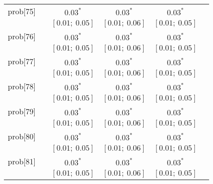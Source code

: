\begin{table}
\begin{center}
\begin{tabular}{l c c c c c }
prob[75]    &                                  & $0.03^{*}$                & $0.03^{*}$                & $0.03^{*}$              &                         \\
            &                                  & $[0.01;\ 0.05]$           & $[0.01;\ 0.06]$           & $[0.01;\ 0.05]$         &                         \\
prob[76]    &                                  & $0.03^{*}$                & $0.03^{*}$                & $0.03^{*}$              &                         \\
            &                                  & $[0.01;\ 0.05]$           & $[0.01;\ 0.06]$           & $[0.01;\ 0.05]$         &                         \\
prob[77]    &                                  & $0.03^{*}$                & $0.03^{*}$                & $0.03^{*}$              &                         \\
            &                                  & $[0.01;\ 0.05]$           & $[0.01;\ 0.06]$           & $[0.01;\ 0.05]$         &                         \\
prob[78]    &                                  & $0.03^{*}$                & $0.03^{*}$                & $0.03^{*}$              &                         \\
            &                                  & $[0.01;\ 0.05]$           & $[0.01;\ 0.06]$           & $[0.01;\ 0.05]$         &                         \\
prob[79]    &                                  & $0.03^{*}$                & $0.03^{*}$                & $0.03^{*}$              &                         \\
            &                                  & $[0.01;\ 0.05]$           & $[0.01;\ 0.06]$           & $[0.01;\ 0.05]$         &                         \\
prob[80]    &                                  & $0.03^{*}$                & $0.03^{*}$                & $0.03^{*}$              &                         \\
            &                                  & $[0.01;\ 0.05]$           & $[0.01;\ 0.06]$           & $[0.01;\ 0.05]$         &                         \\
prob[81]    &                                  & $0.03^{*}$                & $0.03^{*}$                & $0.03^{*}$              &                         \\
            &                                  & $[0.01;\ 0.05]$           & $[0.01;\ 0.06]$           & $[0.01;\ 0.05]$         &                         \\

\end{tabular}
\end{center}
\end{table}
